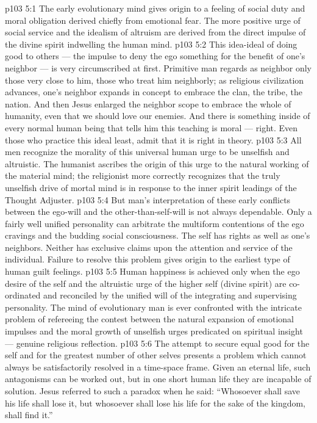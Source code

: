 \vs p103 5:1 The early evolutionary mind gives origin to a feeling of social duty and moral obligation derived chiefly from emotional fear. The more positive urge of social service and the idealism of altruism are derived from the direct impulse of the divine spirit indwelling the human mind.
\vs p103 5:2 This idea\hyp{}ideal of doing good to others --- the impulse to deny the ego something for the benefit of one’s neighbor --- is very circumscribed at first. Primitive man regards as neighbor only those very close to him, those who treat him neighborly; as religious civilization advances, one’s neighbor expands in concept to embrace the clan, the tribe, the nation. And then Jesus enlarged the neighbor scope to embrace the whole of humanity, even that we should love our enemies. And there is something inside of every normal human being that tells him this teaching is moral --- right. Even those who practice this ideal least, admit that it is right in theory.
\vs p103 5:3 All men recognize the morality of this universal human urge to be unselfish and altruistic. The humanist ascribes the origin of this urge to the natural working of the material mind; the religionist more correctly recognizes that the truly unselfish drive of mortal mind is in response to the inner spirit leadings of the Thought Adjuster.
\vs p103 5:4 But man’s interpretation of these early conflicts between the ego\hyp{}will and the other\hyp{}than\hyp{}self\hyp{}will is not always dependable. Only a fairly well unified personality can arbitrate the multiform contentions of the ego cravings and the budding social consciousness. The self has rights as well as one’s neighbors. Neither has exclusive claims upon the attention and service of the individual. Failure to resolve this problem gives origin to the earliest type of human guilt feelings.
\vs p103 5:5 Human happiness is achieved only when the ego desire of the self and the altruistic urge of the higher self (divine spirit) are co\hyp{}ordinated and reconciled by the unified will of the integrating and supervising personality. The mind of evolutionary man is ever confronted with the intricate problem of refereeing the contest between the natural expansion of emotional impulses and the moral growth of unselfish urges predicated on spiritual insight --- genuine religious reflection.
\vs p103 5:6 The attempt to secure equal good for the self and for the greatest number of other selves presents a problem which cannot always be satisfactorily resolved in a time\hyp{}space frame. Given an eternal life, such antagonisms can be worked out, but in one short human life they are incapable of solution. Jesus referred to such a paradox when he said: “Whosoever shall save his life shall lose it, but whosoever shall lose his life for the sake of the kingdom, shall find it.”
